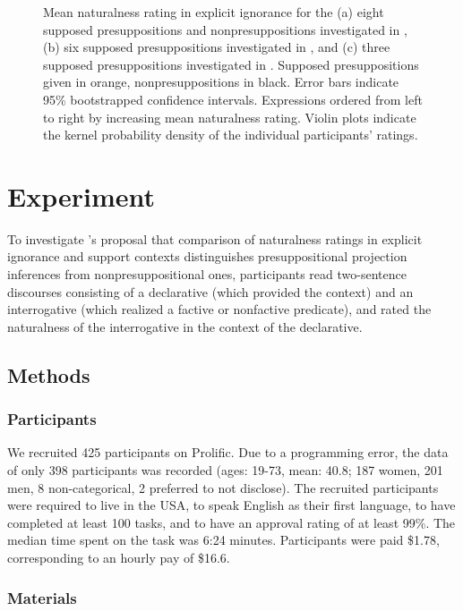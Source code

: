 \documentclass[11pt,fleqn]{article}
\newcommand{\6}{\mbox{$[\hspace*{-.6mm}[$}}
\newcommand{\9}{\mbox{$]\hspace*{-.6mm}]$}}
\newcommand{\citepos}[1]{\citeauthor{#1}'s \citeyear{#1}}
\begin{document}
\begin{figure}[h!]
\caption{Mean naturalness rating in explicit ignorance for the (a)  eight supposed presuppositions and nonpresuppositions investigated in \citealt[Exp.~3]{mandelkern-etal2020}, (b) six supposed presuppositions investigated in \citealt[Exp.~1]{kalomoiros-schwarz2024}, and (c) three supposed presuppositions investigated in \citealt[Exp.2]{kalomoiros-schwarz2024}. Supposed presuppositions given in \color{orange}orange\color{black}, nonpresuppositions in black. Error bars indicate 95\% bootstrapped confidence intervals. Expressions ordered from left to right by increasing mean naturalness rating. Violin plots indicate the kernel probability density of the individual participants' ratings.}\label{fig:eic}
\end{figure}

\section{Experiment}\label{s2}

To investigate \citepos{mandelkern-etal2020} proposal that comparison of naturalness ratings in explicit ignorance and support contexts distinguishes presuppositional projection inferences from nonpresuppositional ones, participants read two-sentence discourses consisting of a declarative (which provided the context) and an interrogative (which realized a factive or nonfactive predicate), and rated the naturalness of the interrogative in the context of the declarative.

\subsection{Methods}\label{s-methods}

\subsubsection{Participants}

We recruited 425 participants on Prolific. Due to a programming error, the data of only 398 participants was recorded (ages: 19-73, mean: 40.8; 187 women, 201 men, 8 non-categorical, 2 preferred to not disclose). The recruited participants were required to live in the USA, to speak English as their first language, to have completed at least 100 tasks, and to have an approval rating of at least 99\%. The median time spent on the task was 6:24 minutes. Participants were paid \$1.78, corresponding to an hourly pay of \$16.6.


\subsubsection{Materials}
\end{document}
